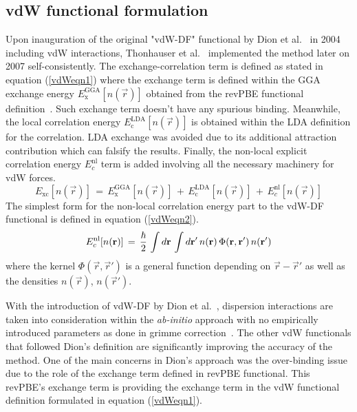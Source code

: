 \subsection{vdW functional formulation}
Upon inauguration of the original "vdW-DF" functional by Dion et al.~\cite{Dion2004} in 2004 including vdW interactions, Thonhauser et al.~\cite{thonhauser2007van} implemented the method later on 2007 self-consistently. The exchange-correlation term is defined as stated in equation (\ref{vdWeqn1}) where the exchange term is defined within the GGA exchange energy $E_{\text{x}}^{\text{GGA}}[n(\vec{r})]$ obtained from the revPBE functional definition~\cite{Zhang1998}. Such exchange term doesn't have any spurious binding. Meanwhile, the local correlation energy $E_{\text{c}}^{\text{LDA}}[n(\vec{r})]$ is obtained within the LDA definition for the correlation. LDA exchange was avoided due to its additional attraction contribution which can falsify the results. Finally, the non-local explicit correlation energy $E_{c}^{\text{nl}}$ term is added involving all the necessary machinery for vdW forces. 
\begin{equation}
E_{\text{xc}}[n(\vec{r})] \, = \, E_{\text{x}}^{\text{GGA}}[n(\vec{r})] \, + \, E_{\text{c}}^{\text{LDA}}[n(\vec{r})] \, + \, E_{c}^{\text{nl}}[n(\vec{r})]
\label{vdWeqn1}
\end{equation}
The simplest form for the non-local correlation energy part to the vdW-DF functional is defined in equation (\ref{vdWeqn2}).
\begin{equation}
E_{c}^{\text{nl}}[n(\vec{r})] \, = \, {\hbar \over 2} \, \int \!   \, d\vec{r} \, \int \!   \, d\vec{r}' \, n(\vec{r}) \, \Phi(\vec{r},\vec{r}') \, n(\vec{r}') 
\label{vdWeqn2}
\end{equation}
where the kernel $\Phi(\vec{r},\vec{r}')$ is a general function depending on $\vec{r}-\vec{r}'$ as well as the densities $n(\vec{r})$, $n(\vec{r}')$. 

With the introduction of vdW-DF by Dion et al.~\cite{Dion2004}, dispersion interactions are taken into consideration within the \textit{ab-initio} approach with no empirically introduced parameters as done in grimme correction~\cite{Grimme2006}. The other vdW functionals that followed Dion's definition are significantly improving the accuracy of the method. One of the main concerns in Dion's approach was the over-binding issue due to the role of the exchange term defined in revPBE functional. This revPBE's exchange term is providing the exchange term in the vdW functional definition formulated in equation (\ref{vdWeqn1}).

